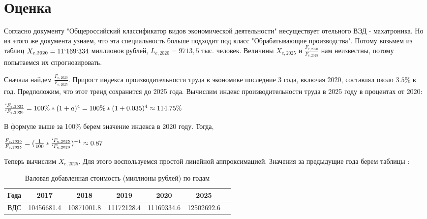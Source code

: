 \section{Оценка}
Согласно документу "Общероссийский классификатор видов экономической деятельности" несуществует
отельного ВЭД - махатроника. Но из этого же документа узнаем, что эта специальность больше подходит под класс "Обрабатывающие производства". 
Потому возьмем из таблиц $X_{e,2020} = 11`169`334 $ миллионов рублей, $L_{e,2020} = 9713,5$ тыс. человек. Величины $X_{e,2025}$ и $\frac{F_{e, 2020}}{F_{e, 2025}}$ нам неизвестны, потому попытаемся их спрогнозировать.
\par
Сначала найдем $\frac{F_{e, 2020}}{F_{e, 2025}}$. Прирост индекса производительности труда в экономике последние 3 года, включая 2020, составлял около $3.5\%$ в год\cite{work-perfomance}. 
Предположим, что этот тренд сохранится до 2025 года. Вычислим индекс
производительности труда в 2025 году в процентах от 2020:
\par
$\frac{`F_{e, 2025}}{`F_{e, 2020}} = 100\%*(1 + a)^4 = 100\%*(1 + 0.035)^4 \approx 114.75\%$

В формуле выше за 100\% берем значение индекса в 2020 году. Тогда,
\par
$\frac{F_{e, 2020}}{F_{e, 2025}} = (\frac{1}{100} * \frac{`F_{e, 2025}}{`F_{e, 2020}})^{-1} \approx 0.87$
\par
Теперь вычислим $X_{e,2025}$. Для этого воспользуемся простой линейной аппроксимацией. 
Значения за предыдущие года берем таблицы \cite{fedstat}:

\begin{table}
\begin{center}
	\caption{Валовая добавленная стоимость (миллионы рублей) по годам}\label{VDS}
	\begin{tabular}{ |c|c|c|c|c|c|c| } 
		\hline
		Года & 2017       & 2018       & 2019       & 2020       & 2025 \\
		\hline
		ВДС  & 10456681.4 & 10871001.8 & 11172128.4 & 11169334.6 & 12502692.6 \\
		\hline
	\end{tabular}
\end{center}
\end{table}

